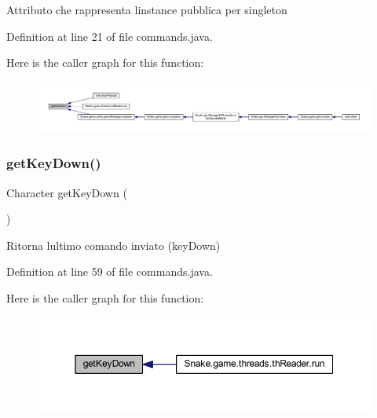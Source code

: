 Attributo che rappresenta l\textquotesingle{}instance pubblica per singleton 

Definition at line 21 of file commands.\+java.

Here is the caller graph for this function\+:
\nopagebreak
\begin{figure}[H]
\begin{center}
\leavevmode
\includegraphics[width=350pt]{class_snake_1_1game_1_1utility_1_1commands_a388ff71d8b8e9c6f6a68839aa5575acc_icgraph}
\end{center}
\end{figure}
\mbox{\label{class_snake_1_1game_1_1utility_1_1commands_aca1e2aeb7fb5a02cf6127edc96edc7f6}} 
\subsubsection{\texorpdfstring{get\+Key\+Down()}{getKeyDown()}}
{\footnotesize\ttfamily Character get\+Key\+Down (\begin{DoxyParamCaption}{ }\end{DoxyParamCaption})}



Ritorna l\textquotesingle{}ultimo comando inviato (key\+Down) 



Definition at line 59 of file commands.\+java.

Here is the caller graph for this function\+:
\nopagebreak
\begin{figure}[H]
\begin{center}
\leavevmode
\includegraphics[width=350pt]{class_snake_1_1game_1_1utility_1_1commands_aca1e2aeb7fb5a02cf6127edc96edc7f6_icgraph}
\end{center}
\end{figure}
\mbox{\label{class_snake_1_1game_1_1utility_1_1commands_a5852b0c61e12c9a0dff32d89faf56a0f}} 
